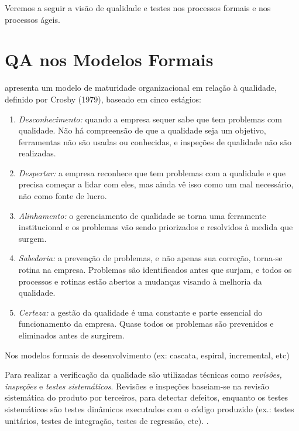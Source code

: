 \documentclass[
	12pt,				%
	openright,			%
	oneside,			%
	a4paper,			%
	english,			%
	brazil,				%
	]{abntex2}
\begin{document}
Veremos a seguir a visão de qualidade e testes nos processos formais e nos processos ágeis. %

\section{QA nos Modelos Formais}
\label{qa-modelos-formais}

 apresenta um modelo de maturidade organizacional em relação à qualidade, definido por Crosby (1979), baseado em cinco estágios:
\begin{enumerate}
    \item \emph{Desconhecimento:} quando a empresa sequer sabe que tem problemas com qualidade. Não há compreensão de que a qualidade seja um objetivo, ferramentas não são usadas ou conhecidas, e inspeções de qualidade não são realizadas.
    \item \emph{Despertar:} a empresa reconhece que tem problemas com a qualidade e que precisa começar a lidar com eles, mas ainda vê isso como um mal necessário, não como fonte de lucro.
    \item \emph{Alinhamento:} o gerenciamento de qualidade se torna uma ferramente institucional e os problemas vão sendo priorizados e resolvidos à medida que surgem.
    \item \emph{Sabedoria:} a prevenção de problemas, e não apenas sua correção, torna-se rotina na empresa. Problemas são identificados antes que surjam, e todos os processos e rotinas estão abertos a mudanças visando à melhoria da qualidade.
    \item \emph{Certeza:} a gestão da qualidade é uma constante e parte essencial do funcionamento da empresa. Quase todos os problemas são prevenidos e eliminados antes de surgirem.
\end{enumerate}

Nos modelos formais de desenvolvimento (ex: cascata, espiral, incremental, etc)

Para realizar a verificação da qualidade são utilizadas técnicas como \emph{revisões, inspeções} e \emph{testes sistemáticos}. Revisões e inspeções baseiam-se na revisão sistemática do produto por terceiros, para detectar defeitos, enquanto os testes sistemáticos são testes dinâmicos executados com o código produzido (ex.: testes unitários, testes de integração, testes de regressão, etc). \cite{WAZLAWICK2013}. %
\end{document}
